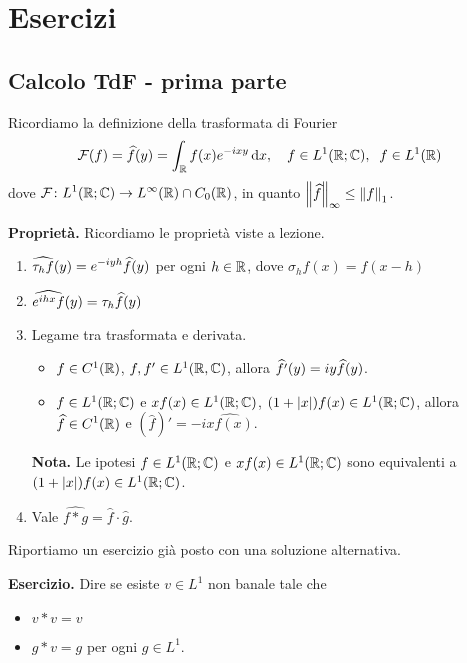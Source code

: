 \section{Esercizi}

\subsection{Calcolo TdF - prima parte}

Ricordiamo la definizione della trasformata di Fourier
%
$$
	\mathcal{F}(f) = \widehat{f}(y) = \int_{\mathbb R} f(x) e^{-ixy} \,\mathrm{d} x, \quad f \in L^1(\mathbb R;\mathbb C), \;\; f \in L^1(\mathbb R)
$$
%
dove $\displaystyle \mathcal{F} \colon L^1(\mathbb R;\mathbb C) \to L^\infty(\mathbb R) \cap C_0(\mathbb R)$, in quanto $\left\lVert \widehat{f} \right\rVert_\infty \leq \left\lVert f \right\rVert_1$.


\textbf{Proprietà.} Ricordiamo le proprietà viste a lezione.

\begin{enumerate}
	\item $\displaystyle \widehat{\tau_h f}(y) = e^{-iyh} \widehat{f}(y)$ per ogni $h \in \mathbb R$, dove $\sigma_h f(x) = f(x - h)$


	\item $\displaystyle \widehat{e^{ihx} f}(y) = \tau_h \widehat{f}(y) $


	\item Legame tra trasformata e derivata.

	\begin{itemize}

		\item $f \in C^1(\mathbb R)$, $f,f' \in L^1(\mathbb R,\mathbb C)$, allora $\displaystyle \widehat{f'}(y) = iy \widehat{f}(y)$.


		\item $f \in L^1(\mathbb R;\mathbb C)$ e $xf(x) \in L^1(\mathbb R;\mathbb C)$, $(1 + |x|) f(x) \in L^1(\mathbb R;\mathbb C)$, allora $\displaystyle \widehat{f} \in C^1(\mathbb R)$ e $(\hat{f})' = -i \hat{xf(x)}$.

	\end{itemize}

	\textbf{Nota.} Le ipotesi $f \in L^1(\mathbb R;\mathbb C)$ e $xf(x) \in L^1(\mathbb R;\mathbb C)$ sono equivalenti a $(1 + |x|) f(x) \in L^1(\mathbb R;\mathbb C)$.


	\item  Vale $\hat{f \ast g} = \hat{f} \cdot \hat{g}$.
	
\end{enumerate}

Riportiamo un esercizio già posto con una soluzione alternativa. 

\textbf{Esercizio.} Dire se esiste $v \in L^1$ non banale tale che 
\begin{itemize}

	\item $v \ast v = v$

	\item $g \ast v = g$ per ogni $g \in L^1$.

\end{itemize}

